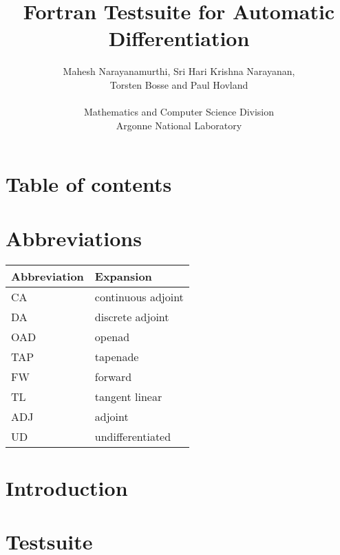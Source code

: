 \documentclass[conference,english]{article}
\begin{document}
\title{Fortran Testsuite for Automatic Differentiation}
\author{Mahesh Narayanamurthi, Sri Hari Krishna Narayanan, \\ Torsten Bosse and Paul Hovland\\\hfill\\
Mathematics and Computer Science Division\\
Argonne National Laboratory\\
}
\maketitle
\clearpage
\section*{Table of contents}
\tableofcontents
\lstlistoflistings
\clearpage
\section{Abbreviations}
\begin{table}[h]
\centering
\label{abbr_table}
\begin{tabular}{@{}|l|l|@{}}
\hline
\textbf{Abbreviation} & \textbf{Expansion}      \\ \hline
CA           & continuous adjoint \\ \hline
DA           & discrete adjoint \\ \hline
OAD           & openad \\ \hline
TAP          & tapenade \\ \hline
FW           & forward \\ \hline
TL           & tangent linear \\ \hline
ADJ           & adjoint \\ \hline
UD           & undifferentiated \\ \hline
\end{tabular}
\end{table}
\clearpage
\section{Introduction}
\clearpage
\section{Testsuite}
\clearpage
\clearpage 
 \clearpage
\end{document}
